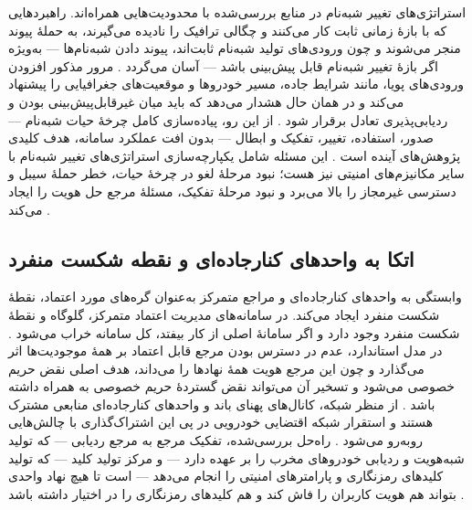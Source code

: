 استراتژی‌های تغییر شبه‌نام در منابع بررسی‌شده با محدودیت‌هایی همراه‌اند. راهبردهایی که با بازهٔ زمانی ثابت کار می‌کنند و چگالی ترافیک را نادیده می‌گیرند، به حملهٔ پیوند منجر می‌شوند و چون ورودی‌های تولید شبه‌نام ثابت‌اند، پیوند دادن شبه‌نام‌ها — به‌ویژه اگر بازهٔ تغییر شبه‌نام قابل پیش‌بینی باشد — آسان می‌گردد \cite{rahmawatiagustinaSystematicLiteratureReview2025}. مرور مذکور افزودن ورودی‌های پویا، مانند شرایط جاده، مسیر خودروها و موقعیت‌های جغرافیایی را پیشنهاد می‌کند و در همان حال هشدار می‌دهد که باید میان غیرقابل‌پیش‌بینی بودن و ردیابی‌پذیری تعادل برقرار شود \cite{rahmawatiagustinaSystematicLiteratureReview2025}. از این رو، پیاده‌سازی کامل چرخهٔ حیات شبه‌نام — صدور، استفاده، تغییر، تفکیک و ابطال — بدون افت عملکرد سامانه، هدف کلیدی پژوهش‌های آینده است \cite{rahmawatiagustinaSystematicLiteratureReview2025}. این مسئله شامل یکپارچه‌سازی استراتژی‌های تغییر شبه‌نام با سایر مکانیزم‌های امنیتی نیز هست؛ نبود مرحلهٔ لغو در چرخهٔ حیات، خطر حملهٔ سیبل و دسترسی غیرمجاز را بالا می‌برد و نبود مرحلهٔ تفکیک، مسئلهٔ مرجع حل هویت را ایجاد می‌کند \cite{rahmawatiagustinaSystematicLiteratureReview2025}.

\subsection{اتکا به واحدهای کنارجاده‌ای و نقطه شکست منفرد}

وابستگی به واحدهای کنارجاده‌ای  و مراجع متمرکز به‌عنوان گره‌های مورد اعتماد، نقطهٔ شکست منفرد  ایجاد می‌کند. در سامانه‌های مدیریت اعتماد متمرکز، گلوگاه و نقطهٔ شکست منفرد وجود دارد و اگر سامانهٔ اصلی از کار بیفتد، کل سامانه خراب می‌شود \cite{ghovanlooyghajarSBTMSScalableBlockchain2021}. در مدل استاندارد، عدم در دسترس بودن مرجع قابل اعتماد بر همهٔ موجودیت‌ها اثر می‌گذارد و چون این مرجع هویت همهٔ نهادها را می‌داند، هدف اصلی نقض حریم خصوصی می‌شود و تسخیر آن می‌تواند نقض گستردهٔ حریم خصوصی به همراه داشته باشد \cite{rahmawatiagustinaSystematicLiteratureReview2025}. از منظر شبکه، کانال‌های پهنای باند و واحدهای کنارجاده‌ای منابعی مشترک هستند و استقرار شبکه اقتضایی خودرویی در پی این اشتراک‌گذاری با چالش‌هایی روبه‌رو می‌شود \cite{hozouriOverviewVANETVehicular2023}. راه‌حل بررسی‌شده، تفکیک مرجع به مرجع ردیابی — که تولید شبه‌هویت و ردیابی خودروهای مخرب را بر عهده دارد — و مرکز تولید کلید — که تولید کلیدهای رمزنگاری و پارامترهای امنیتی را انجام می‌دهد — است تا هیچ نهاد واحدی بتواند هم هویت کاربران را فاش کند و هم کلیدهای رمزنگاری را در اختیار داشته باشد \cite{rahmawatiagustinaSystematicLiteratureReview2025}.

